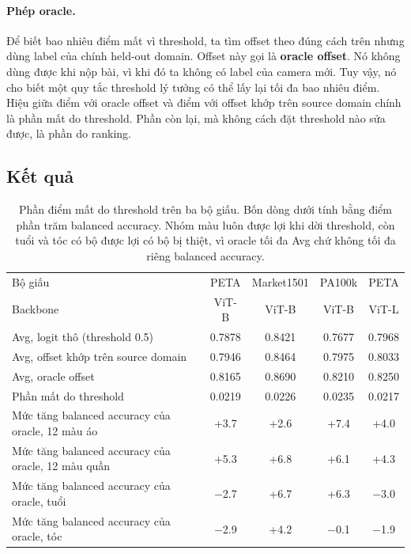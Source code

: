 \documentclass[11pt,a4paper]{article}
\begin{document}
\paragraph{Phép oracle.} Để biết bao nhiêu điểm mất vì threshold, ta tìm offset theo đúng cách trên nhưng dùng label của chính held-out domain. Offset này gọi là \textbf{oracle offset}. Nó không dùng được khi nộp bài, vì khi đó ta không có label của camera mới. Tuy vậy, nó cho biết một quy tắc threshold lý tưởng có thể lấy lại tối đa bao nhiêu điểm. Hiệu giữa điểm với oracle offset và điểm với offset khớp trên source domain chính là phần mất do threshold. Phần còn lại, mà không cách đặt threshold nào sửa được, là phần do ranking.

\subsection{Kết quả}

\begin{table}[H]
\centering\small
\begin{tabular}{@{}lcccc@{}}
\toprule
Bộ giấu & PETA & Market1501 & PA100k & PETA \\
Backbone & ViT-B & ViT-B & ViT-B & ViT-L \\
\midrule
Avg, logit thô (threshold 0.5) & 0.7878 & 0.8421 & 0.7677 & 0.7968 \\
Avg, offset khớp trên source domain & 0.7946 & 0.8464 & 0.7975 & 0.8033 \\
Avg, oracle offset & 0.8165 & 0.8690 & 0.8210 & 0.8250 \\
Phần mất do threshold & 0.0219 & 0.0226 & 0.0235 & 0.0217 \\
\midrule
Mức tăng balanced accuracy của oracle, 12 màu áo & +3.7 & +2.6 & +7.4 & +4.0 \\
Mức tăng balanced accuracy của oracle, 12 màu quần & +5.3 & +6.8 & +6.1 & +4.3 \\
Mức tăng balanced accuracy của oracle, tuổi & $-$2.7 & +6.7 & +6.3 & $-$3.0 \\
Mức tăng balanced accuracy của oracle, tóc & $-$2.9 & +4.2 & $-$0.1 & $-$1.9 \\
\bottomrule
\end{tabular}
\caption{Phần điểm mất do threshold trên ba bộ giấu. Bốn dòng dưới tính bằng điểm phần trăm balanced accuracy. Nhóm màu luôn được lợi khi dời threshold, còn tuổi và tóc có bộ được lợi có bộ bị thiệt, vì oracle tối đa Avg chứ không tối đa riêng balanced accuracy.}
\label{tab:gap}
\end{table}
\end{document}

